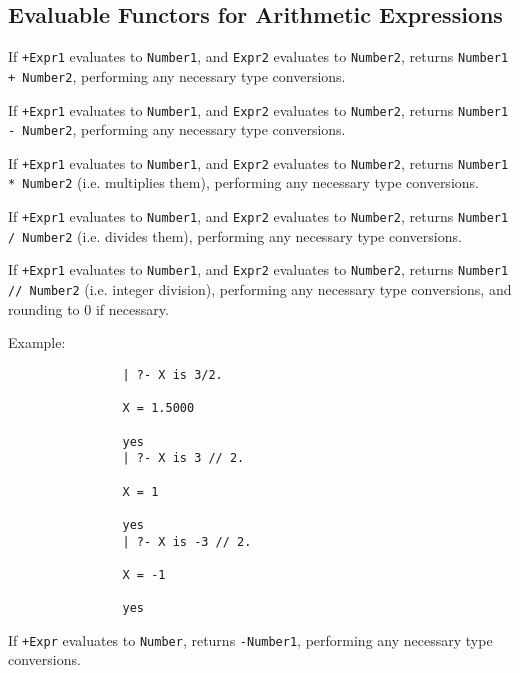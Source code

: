 \subsection{Evaluable Functors for Arithmetic Expressions} \label{sec:arith-eval}

\begin{description}
If {\tt +Expr1} evaluates to {\tt Number1}, and {\tt Expr2} evaluates
to {\tt Number2}, returns {\tt Number1 + Number2}, performing any
necessary type conversions.

If {\tt +Expr1} evaluates to {\tt Number1}, and {\tt Expr2} evaluates
to {\tt Number2}, returns {\tt Number1 - Number2}, performing any
necessary type conversions.

If {\tt +Expr1} evaluates to {\tt Number1}, and {\tt Expr2} evaluates
to {\tt Number2}, returns {\tt Number1 * Number2} (i.e. multiplies
them), performing any necessary type conversions.

If {\tt +Expr1} evaluates to {\tt Number1}, and {\tt Expr2} evaluates
to {\tt Number2}, returns {\tt Number1 / Number2} (i.e. divides
them), performing any necessary type conversions.

If {\tt +Expr1} evaluates to {\tt Number1}, and {\tt Expr2} evaluates
to {\tt Number2}, returns {\tt Number1 // Number2} (i.e. integer
division), performing any necessary type conversions, and rounding to
0 if necessary.  

    Example:
    {\footnotesize
     \begin{verbatim}
                | ?- X is 3/2.

                X = 1.5000

                yes
                | ?- X is 3 // 2.

                X = 1

                yes
                | ?- X is -3 // 2.

                X = -1

                yes
  \end{verbatim}}

%
 If {\tt +Expr} evaluates to {\tt Number}, returns {\tt -Number1},
 performing any necessary type conversions.


\end{description}

